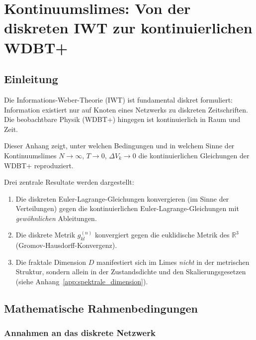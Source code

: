 
\chapter{Kontinuumslimes: Von der diskreten IWT zur kontinuierlichen WDBT+}
\label{app:kontinuumslimes}

\section{Einleitung}
\label{app:kontinuumslimes_einleitung}

Die Informations-Weber-Theorie (IWT) ist fundamental diskret formuliert: Information existiert nur auf Knoten eines Netzwerks zu diskreten Zeitschriften. Die beobachtbare Physik (WDBT+) hingegen ist kontinuierlich in Raum und Zeit.

Dieser Anhang zeigt, unter welchen Bedingungen und in welchem Sinne der Kontinuumslimes \( N \to \infty \), \( T \to 0 \), \( \Delta V_k \to 0 \) die kontinuierlichen Gleichungen der WDBT+ reproduziert.

Drei zentrale Resultate werden dargestellt:

\begin{enumerate}
    \item Die diskreten Euler-Lagrange-Gleichungen konvergieren (im Sinne der Verteilungen) gegen die kontinuierlichen Euler-Lagrange-Gleichungen mit \emph{gewöhnlichen} Ableitungen.
    \item Die diskrete Metrik \( g_{kl}^{(n)} \) konvergiert gegen die euklidische Metrik des \( \mathbb{R}^3 \) (Gromov-Hausdorff-Konvergenz).
    \item Die fraktale Dimension \( D \) manifestiert sich im Limes \emph{nicht} in der metrischen Struktur, sondern allein in der Zustandsdichte und den Skalierungsgesetzen (siehe Anhang~\ref{app:spektrale_dimension}).
\end{enumerate}

\section{Mathematische Rahmenbedingungen}
\label{app:kontinuumslimes_rahmen}

\subsection{Annahmen an das diskrete Netzwerk}
\label{sub:kontinuumslimes_annahmen}

